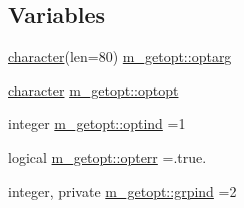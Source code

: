 \subsection*{Variables}
\begin{DoxyCompactItemize}
\item 
\hyperlink{option__stopwatch_83_8txt_abd4b21fbbd175834027b5224bfe97e66}{character}(len=80) \hyperlink{namespacem__getopt_abfaa4b627673956019b3c2148e32a6fa}{m\+\_\+getopt\+::optarg}
\item 
\hyperlink{option__stopwatch_83_8txt_abd4b21fbbd175834027b5224bfe97e66}{character} \hyperlink{namespacem__getopt_a66243e462b4a0546b8ab7c8b5c73eb91}{m\+\_\+getopt\+::optopt}
\item 
integer \hyperlink{namespacem__getopt_acf82c0ecb5e883455b91a3c8620b50c2}{m\+\_\+getopt\+::optind} =1
\item 
logical \hyperlink{namespacem__getopt_a7e1bffca463ec7a33438746eea4f9cf0}{m\+\_\+getopt\+::opterr} =.true.
\item 
integer, private \hyperlink{namespacem__getopt_ae80924cbaae8d0e057ab2a0660cddee4}{m\+\_\+getopt\+::grpind} =2
\end{DoxyCompactItemize}
